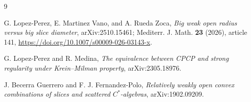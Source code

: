 \documentclass[11pt]{article}
\begin{document}
\begin{thebibliography}{9}

G. Lopez-Perez, E. Martinez Vano, and A. Rueda Zoca,
\emph{Big weak open radius versus big slice diameter},
arXiv:2510.15461; Mediterr. J. Math. \textbf{23} (2026), article 141,
\url{https://doi.org/10.1007/s00009-026-03143-x}.

G. Lopez-Perez and R. Medina,
\emph{The equivalence between CPCP and strong regularity under Krein--Milman
property}, arXiv:2305.18976.

J. Becerra Guerrero and F. J. Fernandez-Polo,
\emph{Relatively weakly open convex combinations of slices and scattered
$C^*$-algebras}, arXiv:1902.09209.

\end{thebibliography}
\end{document}
